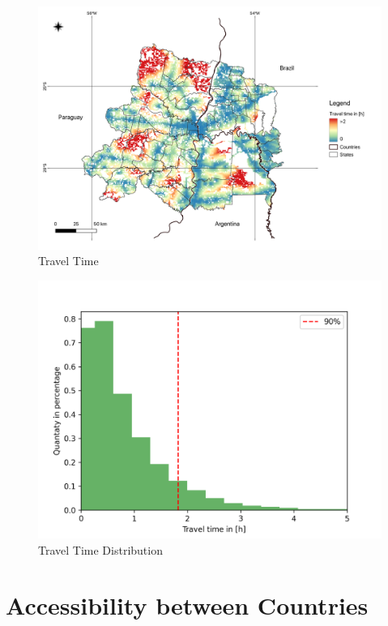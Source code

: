 \documentclass[11pt, a4paper]{report}
\begin{document}
\begin{figure}[H]
  \centering
  \includegraphics[width=0.9\linewidth]{figures/Travel Time.png}
  \caption{Travel Time}
  \label{fig:traveltime}
\end{figure}

\begin{figure}[H]
  \centering
  \includegraphics[width=0.9\linewidth]{figures/traveltimedistribution.png}
  \caption{Travel Time Distribution}
  \label{fig:traveltimedistribution}
\end{figure}

\section{Accessibility between Countries}
\end{document}
